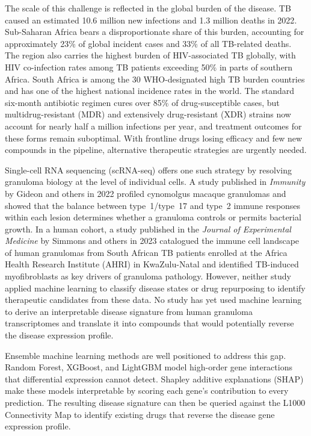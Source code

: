 \documentclass[12pt]{article}
\begin{document}
The scale of this challenge is reflected in the global burden of the disease. TB caused an estimated 10.6 million new infections and 1.3 million deaths in 2022\cite{who2023}. Sub-Saharan Africa bears a disproportionate share of this burden, accounting for approximately 23\% of global incident cases and 33\% of all TB-related deaths\cite{who2023}. The region also carries the highest burden of HIV-associated TB globally, with HIV co-infection rates among TB patients exceeding 50\% in parts of southern Africa\cite{who2023}. South Africa is among the 30 WHO-designated high TB burden countries and has one of the highest national incidence rates in the world\cite{who2023}. The standard six-month antibiotic regimen cures over 85\% of drug-susceptible cases, but multidrug-resistant (MDR) and extensively drug-resistant (XDR) strains now account for nearly half a million infections per year, and treatment outcomes for these forms remain suboptimal\cite{who2023,dean2022}. With frontline drugs losing efficacy and few new compounds in the pipeline, alternative therapeutic strategies are urgently needed.

Single-cell RNA sequencing (scRNA-seq) offers one such strategy by resolving granuloma biology at the level of individual cells. A study published in \textit{Immunity} by Gideon and others in 2022 profiled cynomolgus macaque granulomas and showed that the balance between type~1/type~17 and type~2 immune responses within each lesion determines whether a granuloma controls or permits bacterial growth\cite{gideon2022}. In a human cohort, a study published in the \textit{Journal of Experimental Medicine} by Simmons and others in 2023 catalogued the immune cell landscape of human granulomas from South African TB patients enrolled at the Africa Health Research Institute (AHRI) in KwaZulu-Natal and identified TB-induced myofibroblasts as key drivers of granuloma pathology\cite{scp3227,shalek2017}. However, neither study applied machine learning to classify disease states or drug repurposing to identify therapeutic candidates from these data. No study has yet used machine learning to derive an interpretable disease signature from human granuloma transcriptomes and translate it into compounds that would potentially reverse the disease expression profile.

Ensemble machine learning methods are well positioned to address this gap. Random Forest\cite{breiman2001}, XGBoost\cite{chen2016}, and LightGBM\cite{ke2017} model high-order gene interactions that differential expression cannot detect. Shapley additive explanations (SHAP)\cite{lundberg2017} make these models interpretable by scoring each gene's contribution to every prediction. The resulting disease signature can then be queried against the L1000 Connectivity Map to identify existing drugs that reverse the disease gene expression profile\cite{subramanian2017}.
\end{document}

